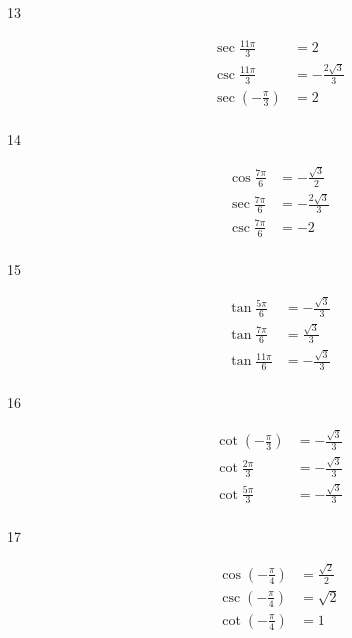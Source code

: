 \documentclass{exam}
\begin{document}
\begin{description}
      \item[13]
        \begin{align*}
          \sec \frac{11 \pi}{3}               & = 2 \\
          \csc \frac{11 \pi}{3}               & = - \frac{2 \sqrt{3}}{3} \\
          \sec \left( - \frac{\pi}{3} \right) & = 2 \\
        \end{align*}

      \item[14]
        \begin{align*}
          \cos \frac{7 \pi}{6} & = - \frac{\sqrt{3}}{2} \\
          \sec \frac{7 \pi}{6} & = - \frac{2 \sqrt{3}}{3} \\
          \csc \frac{7 \pi}{6} & = - 2 \\
        \end{align*}

      \item[15]
        \begin{align*}
          \tan \frac{5 \pi}{6}  & = - \frac{\sqrt{3}}{3} \\
          \tan \frac{7 \pi}{6}  & = \frac{\sqrt{3}}{3} \\
          \tan \frac{11 \pi}{6} & = - \frac{\sqrt{3}}{3} \\
        \end{align*}

      \item[16]
        \begin{align*}
          \cot \left( - \frac{\pi}{3} \right) & = - \frac{\sqrt{3}}{3} \\
          \cot \frac{2 \pi}{3}                & = - \frac{\sqrt{3}}{3} \\
          \cot \frac{5 \pi}{3}                & = - \frac{\sqrt{3}}{3} \\
        \end{align*}

      \item[17]
        \begin{align*}
          \cos \left( - \frac{\pi}{4} \right) & = \frac{\sqrt{2}}{2} \\
          \csc \left( - \frac{\pi}{4} \right) & = \sqrt{2} \\
          \cot \left( - \frac{\pi}{4} \right) & = 1 \\
        \end{align*}


\end{description}
\end{document}
